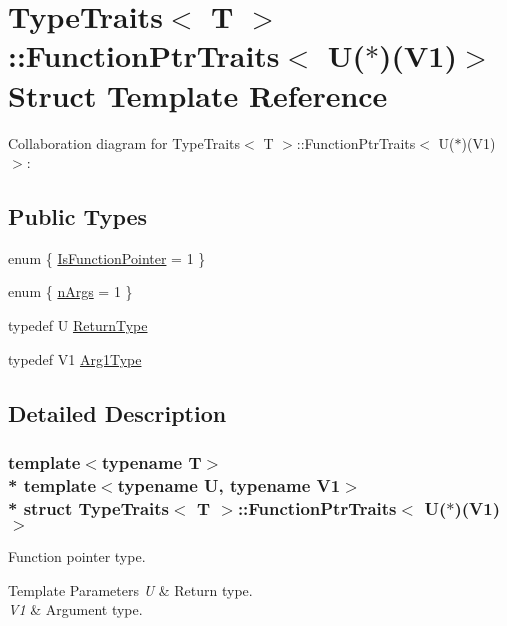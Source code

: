 \hypertarget{structTypeTraits_1_1FunctionPtrTraits_3_01U_07_5_08_07V1_08_4}{}\section{Type\+Traits$<$ T $>$\+:\+:Function\+Ptr\+Traits$<$ U($\ast$)(V1)$>$ Struct Template Reference}
\label{structTypeTraits_1_1FunctionPtrTraits_3_01U_07_5_08_07V1_08_4}


Collaboration diagram for Type\+Traits$<$ T $>$\+:\+:Function\+Ptr\+Traits$<$ U($\ast$)(V1)$>$\+:
\subsection*{Public Types}
\begin{DoxyCompactItemize}
\item 
enum \{ \hyperlink{structTypeTraits_1_1FunctionPtrTraits_3_01U_07_5_08_07V1_08_4_a17a2a782ebe30d81724c575e790cdb36a626a6cf8622ea3d007b7ed23237a14b0}{Is\+Function\+Pointer} = 1
 \}
\item 
enum \{ \hyperlink{structTypeTraits_1_1FunctionPtrTraits_3_01U_07_5_08_07V1_08_4_adc4b37e57c5ca209d20bb7e7a10b34bea50e90749608f026fd2bbd4167c733422}{n\+Args} = 1
 \}
\item 
typedef U \hyperlink{structTypeTraits_1_1FunctionPtrTraits_3_01U_07_5_08_07V1_08_4_a0a470d938f08f9b8daea83dec26a9051}{Return\+Type}
\item 
typedef V1 \hyperlink{structTypeTraits_1_1FunctionPtrTraits_3_01U_07_5_08_07V1_08_4_a0508a173d3cc7b1c28b79a00c2d8aa2e}{Arg1\+Type}
\end{DoxyCompactItemize}


\subsection{Detailed Description}
\subsubsection*{template$<$typename T$>$\\*
template$<$typename U, typename V1$>$\\*
struct Type\+Traits$<$ T $>$\+::\+Function\+Ptr\+Traits$<$ U($\ast$)(\+V1)$>$}

Function pointer type. 
\begin{DoxyTemplParams}{Template Parameters}
{\em U} & Return type. \\
\hline
{\em V1} & Argument type. \\
\hline
\end{DoxyTemplParams}


